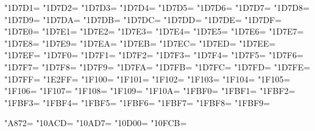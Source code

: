 \XeTeXcharclass"1D7D1=\KclassNum
\XeTeXcharclass"1D7D2=\KclassNum
\XeTeXcharclass"1D7D3=\KclassNum
\XeTeXcharclass"1D7D4=\KclassNum
\XeTeXcharclass"1D7D5=\KclassNum
\XeTeXcharclass"1D7D6=\KclassNum
\XeTeXcharclass"1D7D7=\KclassNum
\XeTeXcharclass"1D7D8=\KclassNum
\XeTeXcharclass"1D7D9=\KclassNum
\XeTeXcharclass"1D7DA=\KclassNum
\XeTeXcharclass"1D7DB=\KclassNum
\XeTeXcharclass"1D7DC=\KclassNum
\XeTeXcharclass"1D7DD=\KclassNum
\XeTeXcharclass"1D7DE=\KclassNum
\XeTeXcharclass"1D7DF=\KclassNum
\XeTeXcharclass"1D7E0=\KclassNum
\XeTeXcharclass"1D7E1=\KclassNum
\XeTeXcharclass"1D7E2=\KclassNum
\XeTeXcharclass"1D7E3=\KclassNum
\XeTeXcharclass"1D7E4=\KclassNum
\XeTeXcharclass"1D7E5=\KclassNum
\XeTeXcharclass"1D7E6=\KclassNum
\XeTeXcharclass"1D7E7=\KclassNum
\XeTeXcharclass"1D7E8=\KclassNum
\XeTeXcharclass"1D7E9=\KclassNum
\XeTeXcharclass"1D7EA=\KclassNum
\XeTeXcharclass"1D7EB=\KclassNum
\XeTeXcharclass"1D7EC=\KclassNum
\XeTeXcharclass"1D7ED=\KclassNum
\XeTeXcharclass"1D7EE=\KclassNum
\XeTeXcharclass"1D7EF=\KclassNum
\XeTeXcharclass"1D7F0=\KclassNum
\XeTeXcharclass"1D7F1=\KclassNum
\XeTeXcharclass"1D7F2=\KclassNum
\XeTeXcharclass"1D7F3=\KclassNum
\XeTeXcharclass"1D7F4=\KclassNum
\XeTeXcharclass"1D7F5=\KclassNum
\XeTeXcharclass"1D7F6=\KclassNum
\XeTeXcharclass"1D7F7=\KclassNum
\XeTeXcharclass"1D7F8=\KclassNum
\XeTeXcharclass"1D7F9=\KclassNum
\XeTeXcharclass"1D7FA=\KclassNum
\XeTeXcharclass"1D7FB=\KclassNum
\XeTeXcharclass"1D7FC=\KclassNum
\XeTeXcharclass"1D7FD=\KclassNum
\XeTeXcharclass"1D7FE=\KclassNum
\XeTeXcharclass"1D7FF=\KclassNum
\XeTeXcharclass"1E2FF=\KclassNum
\XeTeXcharclass"1F100=\KclassNum
\XeTeXcharclass"1F101=\KclassNum
\XeTeXcharclass"1F102=\KclassNum
\XeTeXcharclass"1F103=\KclassNum
\XeTeXcharclass"1F104=\KclassNum
\XeTeXcharclass"1F105=\KclassNum
\XeTeXcharclass"1F106=\KclassNum
\XeTeXcharclass"1F107=\KclassNum
\XeTeXcharclass"1F108=\KclassNum
\XeTeXcharclass"1F109=\KclassNum
\XeTeXcharclass"1F10A=\KclassNum
\XeTeXcharclass"1FBF0=\KclassNum
\XeTeXcharclass"1FBF1=\KclassNum
\XeTeXcharclass"1FBF2=\KclassNum
\XeTeXcharclass"1FBF3=\KclassNum
\XeTeXcharclass"1FBF4=\KclassNum
\XeTeXcharclass"1FBF5=\KclassNum
\XeTeXcharclass"1FBF6=\KclassNum
\XeTeXcharclass"1FBF7=\KclassNum
\XeTeXcharclass"1FBF8=\KclassNum
\XeTeXcharclass"1FBF9=\KclassNum

\XeTeXcharclass"A872=\KclassArabL
\XeTeXcharclass"10ACD=\KclassArabL
\XeTeXcharclass"10AD7=\KclassArabL
\XeTeXcharclass"10D00=\KclassArabL
\XeTeXcharclass"10FCB=\KclassArabL

